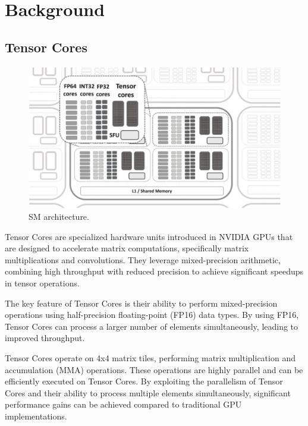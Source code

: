 \documentclass[conference]{IEEEtran}
\begin{document}
  \section{Background}\label{sec:background}
  
  \subsection{Tensor Cores}\label{sec:tensor-cores}
  \begin{figure}[htbp]
    \centering
    \includegraphics[scale=0.32]{figures/SM.png}
    \caption{SM architecture.\cite{NVIDIA_Tensor_Core_Programmability_KTH}}
    \label{fig:performance-comparison}
  \end{figure}

  Tensor Cores are specialized hardware units introduced in NVIDIA GPUs that are designed to accelerate matrix computations, 
  specifically matrix multiplications and convolutions. They leverage mixed-precision arithmetic, 
  combining high throughput with reduced precision to achieve significant speedups in tensor operations.
  
  The key feature of Tensor Cores is their ability to perform mixed-precision operations using 
  half-precision floating-point (FP16) data types. By using FP16, Tensor Cores can process a larger 
  number of elements simultaneously, leading to improved throughput. 
  
  Tensor Cores operate on 4x4 matrix tiles, performing matrix multiplication and accumulation (MMA) 
  operations. These operations are highly parallel and can be efficiently executed on Tensor Cores. 
  By exploiting the parallelism of Tensor Cores and their ability to process multiple elements 
  simultaneously, significant performance gains can be achieved compared to traditional GPU 
  implementations.
  
\end{document}
